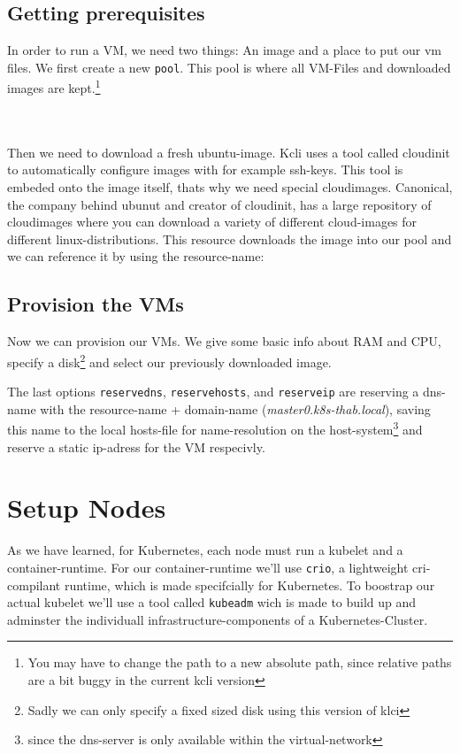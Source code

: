 \subsection{Getting prerequisites}
In order to run a VM, we need two things: An image and a place to put our vm files. 
We first create a new \texttt{pool}. This pool is where all VM-Files and downloaded images are kept.\footnote{You may have to change the path to a new absolute path, since relative paths are a bit buggy in the current kcli version}

\\\\
Then we need to download a fresh ubuntu-image. Kcli uses a tool called cloudinit to automatically configure images with for example ssh-keys. This tool is embeded onto the image itself, thats why we need special cloudimages. Canonical, the company behind ubunut and creator of cloudinit, has a large repository of cloudimages where you can download a variety of different cloud-images for different linux-distributions.
This resource downloads the image into our pool and we can reference it by using the resource-name:

\subsection{Provision the VMs}
Now we can provision our VMs. We give some basic info about RAM and CPU, specify a disk\footnote{Sadly we can only specify a fixed sized disk using this version of klci} and select our previously downloaded image.

The last options \texttt{reservedns}, \texttt{reservehosts}, and \texttt{reserveip} are reserving a dns-name with the resource-name + domain-name (\textit{master0.k8s-thab.local}), saving this name to the local hosts-file for name-resolution on the host-system\footnote{since the dns-server is only available within the virtual-network} and reserve a static ip-adress for the VM respecivly.


\section{Setup Nodes}
As we have learned, for Kubernetes, each node must run a kubelet and a container-runtime.
For our container-runtime we'll use \texttt{crio}, a lightweight cri-compilant runtime, which is made specifcially for Kubernetes.
To boostrap our actual kubelet we'll use a tool called \texttt{kubeadm} wich is made to build up and adminster the individuall infrastructure-components of a Kubernetes-Cluster.

